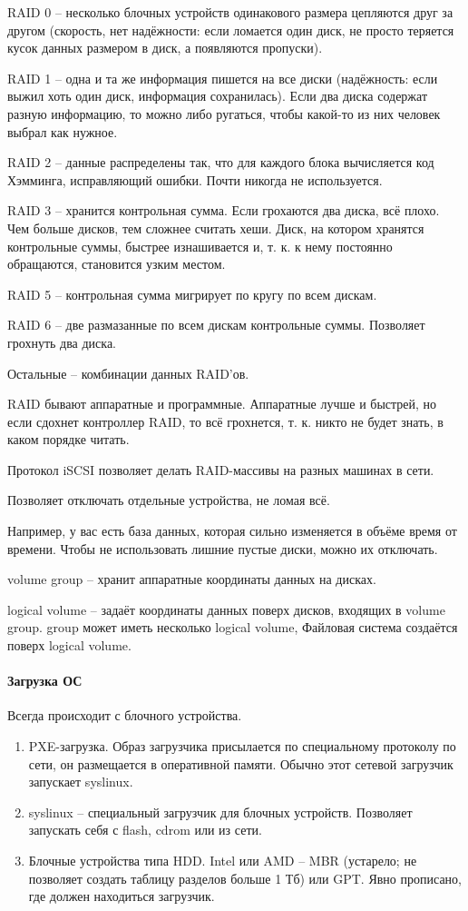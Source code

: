 \documentclass[a4paper,10pt]{article}
\begin{document}
RAID 0 -- несколько блочных устройств одинакового размера цепляются друг за другом (скорость, нет надёжности: если ломается один диск, не просто теряется кусок данных размером в диск, а появляются пропуски).

RAID 1 -- одна и та же информация пишется на все диски (надёжность: если выжил хоть один диск, информация сохранилась). Если два диска содержат разную информацию, то можно либо ругаться, чтобы какой-то из них человек выбрал как нужное.

RAID 2 -- данные распределены так, что для каждого блока вычисляется код Хэмминга, исправляющий ошибки. Почти никогда не используется.

RAID 3 -- хранится контрольная сумма. Если грохаются два диска, всё плохо. Чем больше дисков, тем сложнее считать хеши. Диск, на котором хранятся контрольные суммы, быстрее изнашивается и, т. к. к нему постоянно обращаются, становится узким местом.

RAID 5 -- контрольная сумма мигрирует по кругу по всем дискам.

RAID 6 -- две размазанные по всем дискам контрольные суммы. Позволяет грохнуть два диска.

Остальные -- комбинации данных RAID'ов.

RAID бывают аппаратные и программные. Аппаратные лучше и быстрей, но если сдохнет контроллер RAID, то всё грохнется, т. к. никто не будет знать, в каком порядке читать. 

Протокол iSCSI позволяет делать RAID-массивы на разных машинах в сети.

Позволяет отключать отдельные устройства, не ломая всё.

Например, у вас есть база данных, которая сильно изменяется в объёме время от времени. Чтобы не использовать лишние пустые диски, можно их отключать.

volume group -- хранит аппаратные координаты данных на дисках.

logical volume -- задаёт координаты данных поверх дисков, входящих в volume group. group может иметь несколько logical volume, Файловая система создаётся поверх logical volume.

\paragraph{Загрузка ОС}
Всегда происходит с блочного устройства. 
\begin{enumerate}
\item PXE-загрузка. Образ загрузчика присылается по специальному протоколу по сети, он размещается в оперативной памяти. Обычно этот сетевой загрузчик запускает syslinux.
\item syslinux -- специальный загрузчик для блочных устройств.
Позволяет запускать себя с flash, cdrom или из сети.
\item Блочные устройства типа HDD. Intel или AMD  -- MBR (устарело; не позволяет создать таблицу разделов больше 1 Тб) или GPT. Явно прописано, где должен находиться загрузчик. 
\end{enumerate}
\end{document}
